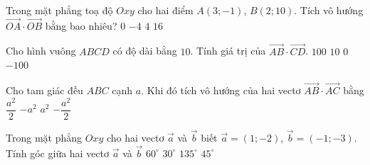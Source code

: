 \begin{ex}%
	Trong mặt phẳng toạ độ $Oxy$ cho hai điểm $A(3;-1)$, $B(2;10)$. Tích vô hướng $\overrightarrow{OA}\cdot\overrightarrow{OB}$ bằng bao nhiêu?
	\choice
	{$0$}
	{\True $-4$}
	{$4$}
	{$16$}
\end{ex}

\begin{ex}%
	Cho hình vuông $ABCD$ có độ dài bằng $10$. Tính giá trị của $\overrightarrow{AB}\cdot \overrightarrow{CD}$.
	\choice
	{$100 $}
	{$10 $}
	{$0 $}
	{\True $-100 $}
\end{ex}

\begin{ex}%
Cho tam giác đều $ABC$ cạnh $a$. Khi đó tích vô hướng của hai vectơ $\overrightarrow{AB}\cdot\overrightarrow{AC}$ bằng
\choice
{\True $\dfrac{a^2}{2}$}
{$-a^2$}
{$a^2$}
{$-\dfrac{a^2}{2}$}
\end{ex}

\begin{ex}%
	Trong mặt phẳng $Oxy$ cho hai vectơ $\overrightarrow{a}$ và $\overrightarrow{b}$ biết $\overrightarrow{a}=(1;-2)$, $\overrightarrow{b}=(-1;-3)$. Tính góc giữa hai vectơ $\overrightarrow{a}$ và $\overrightarrow{b}$
	\choice
	{$60^\circ$}
	{$30^\circ$}
	{$135^\circ$}
	{\True $45^\circ$}
\end{ex}


